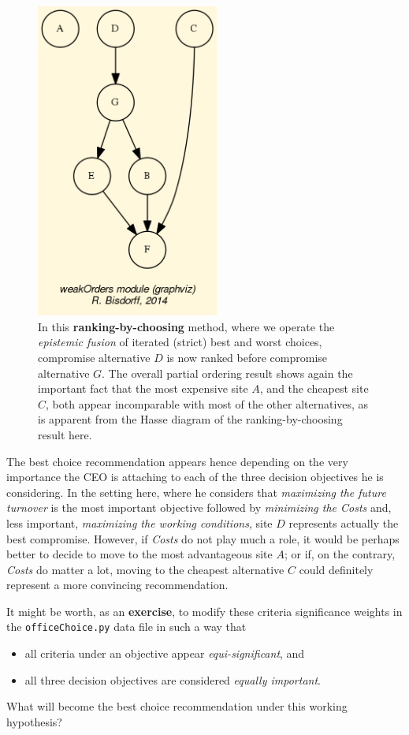 \begin{figure}[h]
\sidecaption
\includegraphics[width=6cm]{Figures/officeChoiceRanking.png}
\caption{In this \textbf{ranking-by-choosing} method, where we operate the \emph{epistemic fusion} of iterated (strict) best and worst choices, compromise alternative $D$ is now ranked before compromise alternative $G$. The overall partial ordering result shows again the important fact that the most expensive site $A$, and the cheapest site $C$, both appear incomparable with most of the other alternatives, as is apparent from the Hasse diagram of the ranking-by-choosing result here.} 
\label{fig:6.5}       %
\end{figure}
	   
The best choice recommendation appears hence depending on the very importance the CEO is attaching to each of the three decision objectives he is considering. In the setting here, where he considers that \emph{maximizing the future turnover} is the most important objective followed by \emph{minimizing the Costs} and, less important, \emph{maximizing the working conditions}, site $D$ represents actually the best compromise. However, if \emph{Costs} do not play much a role, it would be perhaps better to decide to move to the most advantageous site $A$; or if, on the contrary, \emph{Costs} do matter a lot, moving to the cheapest alternative $C$ could definitely represent a more convincing recommendation. 

It might be worth, as an \textbf{exercise}, to modify these criteria significance weights in the \texttt{officeChoice.py} data file in such a way that
\begin{itemize}
\item all criteria under an objective appear \emph{equi-significant}, and
\item all three decision objectives are considered \emph{equally important}.
\end{itemize}

What will become the best choice recommendation under this working hypothesis?  

 

